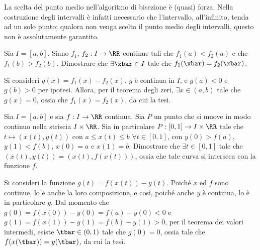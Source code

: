 \documentclass[11pt]{article}
\begin{document}
	\begin{remark}
		La scelta del punto medio nell'algoritmo di bisezione è (quasi)
		forza. Nella costruzione degli intervalli è infatti
		necessario che l'intervallo, all'infinito, tenda ad un solo
		punto; qualora non venga scelto il punto medio degli intervalli,
		questo non è assolutamente garantito.
	\end{remark}

	\begin{exercise}
		Sia $I = [a, b]$. Siano $f_1$, $f_2 : I \to \RR$ continue tali che
		$f_1(a) < f_2(a)$ e che $f_1(b) > f_2(b)$. Dimostrare che $\exists \xbar \in I$ tale che $f_1(\xbar) = f_2(\xbar)$.
	\end{exercise}

	\begin{solution}
		Si consideri $g(x) = f_1(x) - f_2(x)$. $g$ è continua in $I$, e
		$g(a) < 0$ e $g(b) > 0$ per ipotesi. Allora, per il teorema degli
		zeri, $\exists x \in (a, b)$ tale che $g(x) = 0$, ossia
		che $f_1(x) = f_2(x)$, da cui la tesi.
	\end{solution}
	
	\begin{exercise}
		Sia $I = [a, b]$ e sia $f: I \to \RR$ continua. Sia $P$ un punto che si muove in modo continuo nella striscia $I \times \RR$. Sia in
		particolare $P : [0, 1] \to I \times \RR$ tale che
		$t \mapsto (x(t), y(t))$ con $a \leq x(t) \leq b$ $\forall t \in [0, 1]$, con $y(0) > f(a)$, $y(1) < f(b)$, $x(0) = a$ e $x(1) = b$. Dimostrare che $\exists t \in
		[0, 1]$ tale che $(x(t), y(t)) = (x(t), f(x(t)))$, ossia che tale
		curva si interseca con la funzione $f$.
	\end{exercise}

	\begin{solution}
		Si consideri la funzione $g(t) = f(x(t)) - y(t)$. Poiché $x$ ed
		$f$ sono continue, lo è anche la loro composizione, e così,
		poiché anche $y$ è continua, lo è in particolare $g$. Dal momento
		che $g(0) = f(x(0)) - y(0) = f(a) - y(0) < 0$ e $g(1) =
		f(x(1)) - y(1) = f(b) - y(1) > 0$, per il teorema dei valori
		intermedi, esiste $\tbar \in (0, 1)$ tale che $g(0) = 0$,
		ossia tale che $f(x(\tbar)) = y(\tbar)$, da cui la tesi.
	\end{solution}
	
\end{document}
